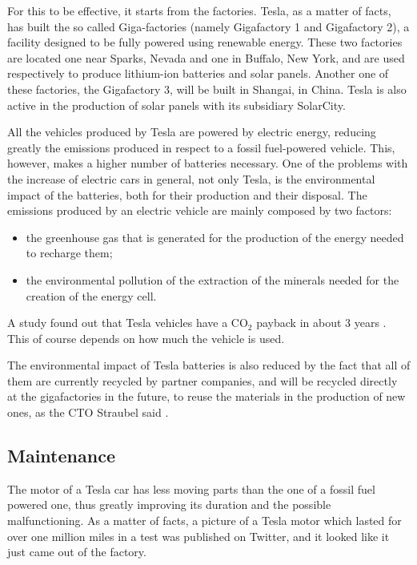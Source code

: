 For this to be effective, it starts from the factories. Tesla, as a matter of facts, has built the so called Giga-factories (namely Gigafactory 1 and Gigafactory 2), a facility designed to be fully powered using renewable energy. These two factories are located one near Sparks, Nevada and one in Buffalo, New York, and are used respectively to produce lithium-ion batteries and solar panels.
Another one of these factories, the Gigafactory 3, will be built in Shangai, in China. 
Tesla is also active in the production of solar panels with its subsidiary SolarCity.

All the vehicles produced by Tesla are powered by electric energy, reducing greatly the emissions produced in respect to a fossil fuel-powered vehicle. This, however, makes a higher number of batteries necessary. 
One of the problems with the increase of electric cars in general, not only Tesla, is the environmental impact of the batteries, both for their production and their disposal. 
The emissions produced by an electric vehicle are mainly composed by two factors:
\begin{itemize}
    \item the greenhouse gas that is generated for the production of the energy needed to recharge them;
    \item the environmental pollution of the extraction of the minerals needed for the creation of the energy cell\cite{scheele2016cobalt}.
\end{itemize}
 A study found out that Tesla vehicles have a CO$_2$ payback in about 3 years \cite{electricStudy}. This of course depends on how much the vehicle is used. 

The environmental impact of Tesla batteries is also reduced by the fact that all of them are currently recycled by partner companies, and will be recycled directly at the gigafactories in the future, to reuse the materials in the production of new ones, as the CTO Straubel said \cite{recycleBattery}.

\subsection{Maintenance}

The motor of a Tesla car has less moving parts than the one of a fossil fuel powered one, thus greatly improving its duration and the possible malfunctioning. As a matter of facts, a picture of a Tesla motor which lasted for over one million miles in a test was published on Twitter, and it looked like it just came out of the factory\cite{tesla1mMiles}.

